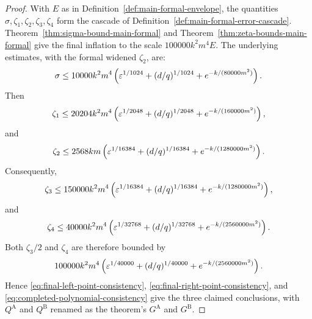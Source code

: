 \begin{proof}
	With $E$ as in Definition~\ref{def:main-formal-envelope}, the quantities $\sigma,\zeta_1,\zeta_2,\zeta_3,\zeta_4$ form the cascade of Definition~\ref{def:main-formal-error-cascade}. Theorem~\ref{thm:sigma-bound-main-formal} and Theorem~\ref{thm:zeta-bounds-main-formal} give the final inflation to the scale $100000k^2m^4 E$. The underlying estimates, with the formal widened $\zeta_2$, are:
	\[
		\sigma \le 10000k^2m^4\left(\varepsilon^{1/1024}+(d/q)^{1/1024}+e^{-k/(80000m^2)}\right).
	\]
	Then
	\[
		\zeta_1 \le 20204k^2m^4\left(\varepsilon^{1/2048}+(d/q)^{1/2048}+e^{-k/(160000m^2)}\right),
	\]
	and
	\[
		\zeta_2 \le 2568km\left(\varepsilon^{1/16384}+(d/q)^{1/16384}+e^{-k/(1280000m^2)}\right).
	\]
	Consequently,
	\[
		\zeta_3 \le 150000k^2m^4\left(\varepsilon^{1/16384}+(d/q)^{1/16384}+e^{-k/(1280000m^2)}\right),
	\]
	and
	\[
		\zeta_4 \le 40000k^2m^4\left(\varepsilon^{1/32768}+(d/q)^{1/32768}+e^{-k/(2560000m^2)}\right).
	\]
	Both $\zeta_3/2$ and $\zeta_4$ are therefore bounded by
	\[
		100000k^2m^4\left(\varepsilon^{1/40000}+(d/q)^{1/40000}+e^{-k/(2560000m^2)}\right).
	\]
	Hence \ref{eq:final-left-point-consistency}, \ref{eq:final-right-point-consistency}, and \ref{eq:completed-polynomial-consistency} give the three claimed conclusions, with $Q^{\mathrm A}$ and $Q^{\mathrm B}$ renamed as the theorem's $G^{\mathrm A}$ and $G^{\mathrm B}$.
\end{proof}
